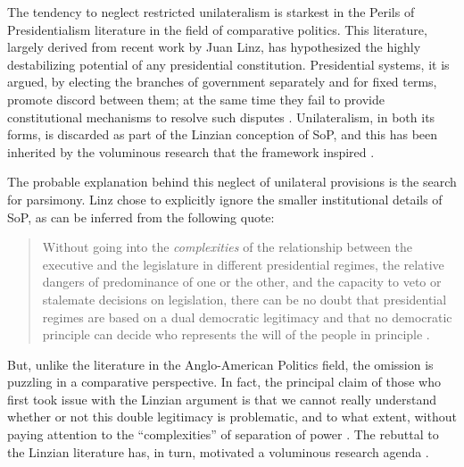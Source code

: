 The tendency to neglect restricted unilateralism is starkest in the Perils of Presidentialism literature in the field of comparative politics.  This literature, largely derived from recent work by Juan Linz, has hypothesized the highly destabilizing potential of any presidential constitution.  Presidential systems, it is argued, by electing the branches of government separately and for fixed terms, promote discord between them; at the same time they fail to provide constitutional mechanisms to resolve such disputes \citep{linz.1990,linz.valenzuela.1994}.  Unilateralism, in both its forms, is discarded as part of the Linzian conception of SoP, and this has been inherited by the voluminous research that the framework inspired \citep{linz.valenzuela.1994}.  

The probable explanation behind this neglect of unilateral provisions is the search for parsimony.  Linz chose to explicitly ignore the smaller institutional details of SoP, as can be inferred from the following quote:

\begin{quote}
Without going into the \emph{complexities} of the relationship between the executive and the legislature in different presidential regimes, the relative dangers of predominance of one or the other, and the capacity to veto or stalemate decisions on legislation, there can be no doubt that presidential regimes are based on a dual democratic legitimacy and that no democratic principle can decide who represents the will of the people in principle \citep[][7, emphasis added]{linz.1994}.
\end{quote}

But, unlike the literature in the Anglo-American Politics field, the omission is puzzling in a comparative perspective.  In fact, the principal claim of those who first took issue with the Linzian argument is that we cannot really understand whether or not this double legitimacy is problematic, and to what extent, without paying attention to the “complexities” of separation of power \citep{shugart.carey.1992}.  The rebuttal to the Linzian literature has, in turn, motivated a voluminous research agenda \citep{mainwaring.shugart.1997}.  

